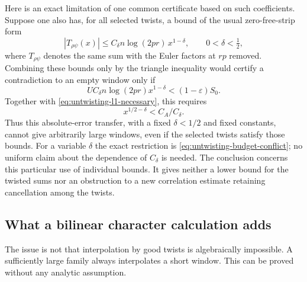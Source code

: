 \documentclass[11pt]{article}
\theoremstyle{definition}
\theoremstyle{remark}
\begin{document}
Here is an exact limitation of one common certificate based on
such coefficients. Suppose one also has, for all selected twists,
a bound of the usual zero-free-strip form
\[
 |T_{\rho\psi}(x)|
 \leq C_\delta n\log(2pr)\,x^{1-\delta},
 \qquad 0<\delta<\tfrac12,
\]
where \(T_{\rho\psi}\) denotes the same sum with the Euler factors
at \(rp\) removed. Combining these bounds only by the triangle
inequality would certify a contradiction to an empty window only if
\[
 U C_\delta n\log(2pr)x^{1-\delta}
 <(1-\varepsilon)S_0.
\]
Together with \eqref{eq:untwisting-l1-necessary}, this requires
\begin{equation}\label{eq:untwisting-budget-conflict}
 x^{1/2-\delta}<C_A/C_\delta.
\end{equation}
Thus this absolute-error transfer, with a fixed
\(\delta<1/2\) and fixed constants, cannot give arbitrarily large
windows, even if the selected twists satisfy those bounds.
For a variable \(\delta\) the exact restriction is
\eqref{eq:untwisting-budget-conflict}; no uniform claim about
the dependence of \(C_\delta\) is needed.
The conclusion concerns this particular use of individual bounds.
It gives neither a lower bound for the twisted sums
nor an obstruction to a new correlation estimate retaining
cancellation among the twists.

\subsection{What a bilinear character calculation adds}

The issue is not that interpolation by good twists is algebraically
impossible. A sufficiently large family always interpolates a short
window. This can be proved without any analytic assumption.
\end{document}
